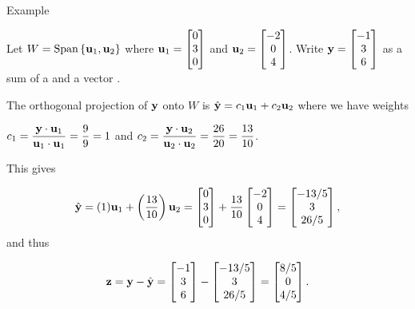 \documentclass[xcolor=dvipsnames,aspectratio=169,t]{beamer}
\begin{document}
\begin{frame}{Example}
  \smallskip

  Let $W = \mbox{Span} \left\{ \mathbf{u}_1 , \mathbf{u}_2 \right\}$ where $\mathbf{u}_1 = \begin{bmatrix} 0 \\ 3 \\ 0 \end{bmatrix}$ and $\mathbf{u}_2 = \begin{bmatrix} -2 \\ 0 \\ 4 \end{bmatrix}$. Write $\mathbf{y} = \begin{bmatrix} -1 \\ 3 \\ 6 \end{bmatrix}$ as a \alert{sum} of a  and a vector .
  \medskip

  \pause
  The orthogonal projection of $\mathbf{y}$ onto $W$ is $\hat{\mathbf{y}} = c_1 \mathbf{u}_1 + c_2 \mathbf{u}_2$ where we have weights
  \bigskip
  
  {\small
  \qquad
  $c_1 =  \displaystyle\frac{\mathbf{y} \cdot \mathbf{u}_1}{\mathbf{u}_1 \cdot \mathbf{u}_1} = \frac{9}{9} = 1$ and 
  $c_2 = \displaystyle\frac{\mathbf{y} \cdot \mathbf{u}_2}{\mathbf{u}_2 \cdot \mathbf{u}_2} = \frac{26}{20} = \frac{13}{10}$. 
  \bigskip

  This gives
  
  \vspace{-0.7em}

  \[ \hat{\mathbf{y}} = (1)\mathbf{u}_1 +  \left( \frac{13}{10}\right)  \mathbf{u}_2 = \begin{bmatrix} 0 \\ 3 \\ 0 \end{bmatrix} + \frac{13}{10} \begin{bmatrix} -2 \\ 0 \\ 4 \end{bmatrix} = \begin{bmatrix} -13/5 \\ 3 \\ 26/5 \end{bmatrix}, \]
  and thus

  \vspace{-0.3em}
  
  \[ \mathbf{z} = \mathbf{y} - \hat{\mathbf{y}} = \begin{bmatrix} -1 \\ 3 \\ 6 \end{bmatrix} - \begin{bmatrix} -13/5 \\ 3 \\ 26/5 \end{bmatrix} = \begin{bmatrix} 8/5 \\ 0 \\ 4/5 \end{bmatrix}. \]
  }
\end{frame}
\end{document}
